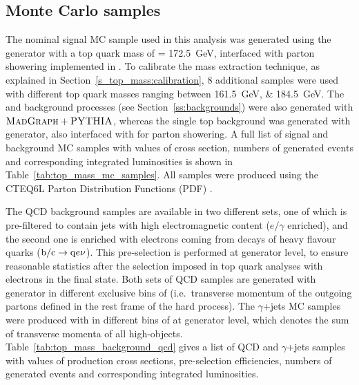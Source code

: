 

\subsection{Monte Carlo samples}
\label{ss_top_mass:mc_samples}

The nominal signal \ttbar MC sample used in this analysis was generated using the \MADGRAPH generator with a top quark
mass of \mtop = \SI{172.5}{\GeV}, interfaced with parton showering implemented in \PYTHIA. To calibrate the mass
extraction technique, as explained in Section~\ref{s_top_mass:calibration}, 8 additional \ttbar samples were used with
different top quark masses ranging between \SIlist{161.5;184.5}{\GeV}. The \WpJets and \ZpJets background processes (see
Section~\ref{ss:backgrounds}) were also generated with $\textsc{MadGraph}+{\textsc{PYTHIA}}$, whereas the single top background was
generated with \POWHEG generator, also interfaced with \PYTHIA for parton showering. A full list of signal \ttbar and
background MC samples with values of cross section, numbers of generated events and corresponding integrated
luminosities is shown in Table~\ref{tab:top_mass_mc_samples}. All samples were produced using the CTEQ6L Parton
Distribution Functions (PDF) \autocite{CTEQ}.

The QCD background samples are available in two different sets, one of which is pre-filtered to contain jets with high
electromagnetic content ($e/\gamma$ enriched), and the second one is enriched with electrons coming from decays of heavy
flavour quarks ($\mathrm{b}/\mathrm{c} \rightarrow \mathrm{q} e\nu$). This pre-selection is performed at generator level, to ensure
reasonable statistics after the \ttbar selection imposed in top quark analyses with electrons in the final state. Both
sets of QCD samples are generated with \PYTHIA generator in different exclusive bins of \pthat (i.e.\ transverse
momentum of the outgoing partons defined in the rest frame of the hard process). The $\gamma$+jets MC samples were
produced with \MADGRAPH in different bins of \HT at generator level, which denotes the sum of transverse momenta of all
high-\pt objects. Table~\ref{tab:top_mass_background_qcd} gives a list of QCD and $\gamma$+jets samples with values of
production cross sections, pre-selection efficiencies, numbers of generated events and corresponding integrated
luminosities.

